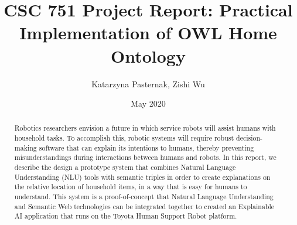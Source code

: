 \documentclass{article}
\title{CSC 751 Project Report: Practical Implementation of OWL Home Ontology}
\author{Katarzyna Pasternak, Zishi Wu}
\date{May 2020}
\begin{document}
\maketitle

\begin{abstract}
Robotics researchers envision a future in which service robots will assist 
humans  with household tasks. To accomplish this, robotic systems will require
robust decision-making software that can explain its intentions to humans, 
thereby preventing misunderstandings during interactions between humans and 
robots. In this report, we describe the design a prototype
system that combines Natural Language Understanding (NLU) tools with semantic 
triples in order to create explanations on the relative location of household 
items, in a way that is easy for humans to understand. This system is a 
proof-of-concept that Natural Language Understanding and Semantic Web 
technologies can be integrated together to created an Explainable AI 
application that runs on the Toyota Human Support Robot platform.
\end{abstract}

\end{document}
